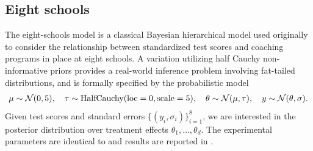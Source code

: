 \documentclass{article}
\theoremstyle{definition}
\theoremstyle{remark}
\begin{document}
\subsection{Eight schools}
\label{ssec:eight_schools}

The eight-schools model \citep{rubin1981estimation,gelman2013bayesian} is a classical
Bayesian hierarchical model used originally to consider the relationship between standardized
test scores and coaching programs in place at eight schools.
A variation utilizing half Cauchy non-informative priors \citep{gelman2006prior} provides
a real-world inference problem involving fat-tailed distributions, and is formally specified
by the probabilistic model
\begin{align*}
    \mu \sim \mathcal{N}(0, 5),\quad
    \tau \sim \text{HalfCauchy}(\text{loc}=0, \text{scale}=5),\quad
    \theta \sim \mathcal{N}(\mu, \tau),\quad
    y \sim \mathcal{N}(\theta, \sigma).
\end{align*}
Given test scores and standard errors $\{(y_i, \sigma_i)\}_{i=1}^8$, we are interested in the
posterior distribution over treatment effects $\theta_1,\ldots,\theta_d$. The experimental
parameters are identical to  and results are reported in .



\end{document}
